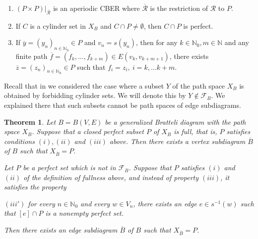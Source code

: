 \documentclass[11pt,reqno]{amsart}
\theoremstyle{definition}
\theoremstyle{remark}
\theoremstyle{plain}
\newtheorem{thm}[definition]{Theorem}
\def\ol{\overline}
\newcommand{\N}{\mathbb N}
\newcommand{\mc}{\mathcal}
\numberwithin{equation}{section}
\begin{document}
\begin{enumerate}[label=(\roman*)]
\item $(P \times P)|_{\ol{\mathcal R}}$ 
is an aperiodic CBER where $\ol{\mathcal R}$ is the restriction of $\mathcal R$ to $P$.
\item If $C$ is a cylinder set in $X_B$ and $C \cap P \neq \emptyset$, then $C \cap P$ is perfect.
\item If $\ol y = (y_n)_{n \in \N_0} \in P$ and $v_n = s(y_n)$, then for any $k \in \N_0,m \in \N$ and any finite path $\ol f = (f_k, \ldots, f_{k+m}) \in E(v_k, v_{k+m+1})$, there exists $\ol z = (z_n)_{n \in \N_0} \in P$ such that $f_i = z_i,\ i = k, \ldots k+m$. 
\end{enumerate}

Recall that in  we considered the case where a subset $Y$ of the path space $X_B$ is obtained by forbidding cylinder sets. We will denote this by $Y \notin \mc F_B $. We explained there that such subsets cannot be path spaces of edge subdiagrams. 

\begin{thm}\label{thm s8 path space}
Let $B=B(V, E)$ be a generalized Bratteli diagram with the path space $X_B$. Suppose that a closed perfect subset $P$ of $X_B$ is full, that is, $P$ satisfies conditions  $(i), (ii)$ and $(iii)$ above. Then there exists a vertex subdiagram $\ol B$ of $B$ such that $X_{\ol B} = P$.

Let $P$ be a perfect set which is not in $\mc F_B$. Suppose that $P$ satisfies $(i)$ and $(ii)$ of the definition of fullness above, and instead of property $(iii)$, it satisfies the property

 $(iii')$ for every $n\in \N_0$ and every $w \in V_n$, there exists an edge $e \in s^{-1}(w)$ such that $[e] \cap P$ is a nonempty perfect set. 

Then there exists an edge subdiagram $\ol B$ of $B$ such that $X_{\ol B} =P$.
\end{thm}
\end{document}

